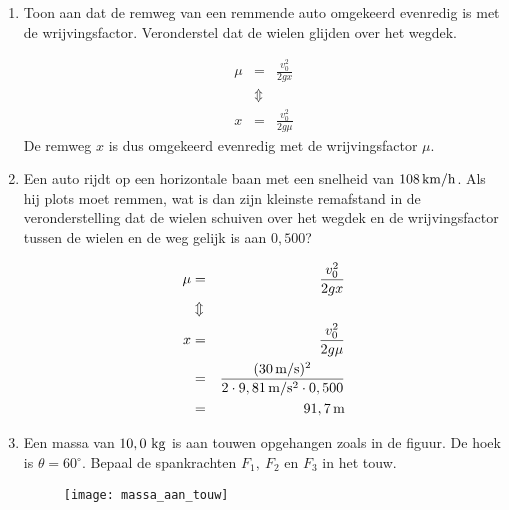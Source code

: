 \begin{enumerate}
\item Toon aan dat de remweg van een remmende auto omgekeerd
evenredig is met de wrijvingsfactor. Veronderstel dat de wielen
glijden over het wegdek.
\begin{oplossing}
\begin{eqnarray*}
\mu&=&\frac{v_0^2}{2gx}\\
&\Updownarrow&\\
x&=&\frac{v_0^2}{2g\mu}
\end{eqnarray*}
De remweg $x$ is dus omgekeerd evenredig met de wrijvingsfactor $\mu$.
\end{oplossing}

\item Een auto rijdt op een horizontale baan met een snelheid van
$108\rm\,km/h$. Als hij plots moet remmen, wat is dan zijn kleinste
remafstand in de veronderstelling dat de wielen schuiven over het
wegdek en de wrijvingsfactor tussen de wielen en de weg gelijk is
aan $0,500$?
\begin{oplossing}
\begin{eqnarray*}
\mu&=&\frac{v_0^2}{2gx}\\
&\Updownarrow&\\
x&=&\frac{v_0^2}{2g\mu}\\
&=&\frac{(30\rm\,m/s)^2}{2\cdot9,81\rm\,m/s^2\cdot0,500}\\
&=&91,7\rm\,m
\end{eqnarray*}
\end{oplossing}


\item Een massa van $10,0~\rm kg$ is aan touwen opgehangen zoals in de figuur. De hoek is $\theta=60^\circ$. Bepaal de spankrachten $F_1,~F_2$ en $F_3$ in het touw.
\begin{figure}[h]
\begin{center}
\texttt{[image: massa\_aan\_touw]}
\end{center}
\end{figure}





\end{enumerate}
